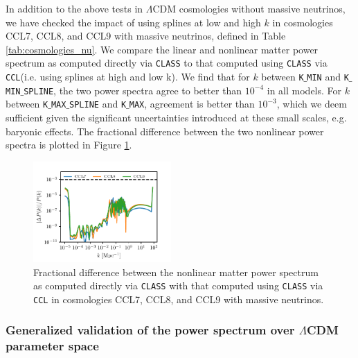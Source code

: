 \documentclass[\docopts]{\docclass}
\newcommand{\ccl}{{\tt CCL}\xspace}
\begin{document}
In addition to the above tests in $\Lambda$CDM cosmologies without massive neutrinos, we have checked the impact of using splines at low and high $k$ in cosmologies CCL7, CCL8, and CCL9 with massive neutrinos, defined in Table \ref{tab:cosmologies_nu}. We compare the linear and nonlinear matter power spectrum as computed directly via {\tt CLASS} to that computed using {\tt CLASS} via \ccl (i.e. using splines at high and low k). We find that for $k$  between {\tt K$\_$MIN} and {\tt K$\_$MIN$\_$SPLINE}, the two power spectra agree to better than $10^{-4}$ in all models. For $k$ between {\tt K$\_$MAX$\_$SPLINE} and {\tt K$\_$MAX}, agreement is better than $10^{-3}$, which we deem sufficient given the significant uncertainties introduced at these small scales, e.g. baryonic effects. The fractional difference between the two nonlinear power spectra is plotted in Figure \ref{fig:power_nu}. 

\begin{figure}
\centering
\includegraphics[width=0.47\textwidth]{pk_class_nu_NL}
\caption{Fractional difference between the nonlinear matter power spectrum as computed directly via {\tt CLASS} with that computed using {\tt CLASS} via \ccl in cosmologies CCL7, CCL8, and CCL9 with massive neutrinos.}
\label{fig:power_nu}
\end{figure}

\subsubsection{Generalized validation of the power spectrum over $\Lambda$CDM parameter space}
\end{document}
